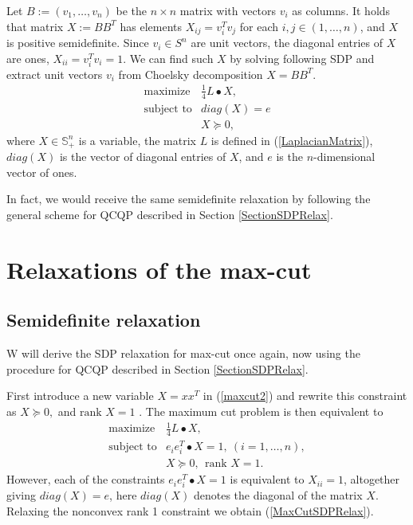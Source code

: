 \documentclass[12pt]{book}
\theoremstyle{definition}
\begin{document}
Let $B := (v_1,\dots ,v_n)$ be the $n\times n$ matrix with vectors $v_i$ as columns. 
It holds that matrix $X:= BB^T$ has elements $ X_{ij} = v_i^Tv_j $ for each $i,j\in (1,\dots,n)$, and $X$ is positive semidefinite.
Since $v_i\in S^n$ are unit vectors, the diagonal entries of $X$ are ones, $X_{ii} = v_i^Tv_i = 1$.
We can find such $X$ by solving following SDP and extract unit vectors $v_i$ from Choelsky decomposition $X = BB^T$.
\begin{equation}
\label{MaxCutSDPRelax}
\begin{array}{ll}
\mbox{maximize} & \frac{1}{4}L\bullet X, \\
\mbox{subject to} & diag(X) = e \\
&	X\succeq 0,
\end{array}
\end{equation} 
where $X\in\mathbb{S}^n_+$ is a variable, the matrix $L$ is defined in (\ref{LaplacianMatrix}), $diag(X)$ is the vector of diagonal entries of $X$, and $e$ is the $n$-dimensional vector of ones.

\rem In fact, we would receive the same semidefinite relaxation by following the general scheme for QCQP described in Section \ref{SectionSDPRelax}.


\section{Relaxations of the max-cut}
\label{SectionMaxCutRelaxation}


\subsection{Semidefinite relaxation}
W will derive the SDP relaxation for max-cut once again, now using the procedure for QCQP described in Section \ref{SectionSDPRelax}.

First introduce a new variable $X = xx^T$ in (\ref{maxcut2})  and rewrite this constraint as $X\succeq 0,$ and $\mbox{rank }X = 1$ . The maximum cut problem is then equivalent to 
\begin{equation}
\label{maxcutstandardSDPstep1}
\begin{array}{ll}
\mbox{maximize} & \frac{1}{4}L\bullet X, \\
\mbox{subject to} & e_ie_i^T\bullet X = 1, \ (i = 1,\dots ,n), \\
				&	X\succeq 0, \ \ \mbox{rank }X = 1.
\end{array}
\end{equation}
However, each of the constraints $e_ie_i^T\bullet X = 1$ is equivalent to $X_{ii} = 1$, altogether giving $diag(X) = e$, here $diag(X)$ denotes the diagonal of the matrix $X$.
Relaxing the nonconvex rank 1 constraint we obtain  (\ref{MaxCutSDPRelax}). 
\end{document}
